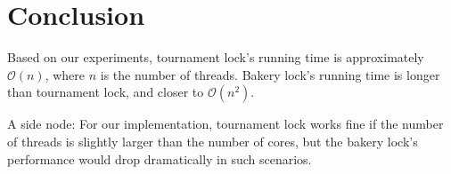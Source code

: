 \documentclass{article}
\newcommand*{\bigO}[1]{\ensuremath{\mathcal{O}\left(#1\right)}}
\begin{document}
\section*{Conclusion}

Based on our experiments, tournament lock's running time is approximately
\bigO{n}, where $n$ is the number of threads. Bakery lock's running time is longer than tournament lock, and closer
to \bigO{n^2}.

A side node: For our implementation, tournament lock works fine if the number
of threads is slightly larger than the number of cores, but the bakery lock's
performance would drop dramatically in such scenarios.
\end{document}
